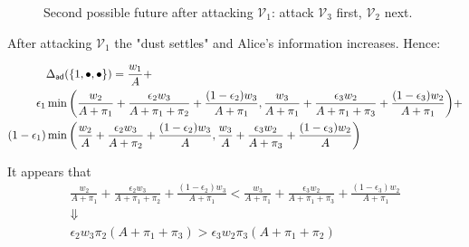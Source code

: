 \documentclass[11pt]{llncs}
\newcommand{\atk}{\begin{turn}{130}{\scriptsize \Lightning}\end{turn}}
\newcommand{\tk}{\raisebox{1ex}{\atk}}
\newcommand{\LL}[2]{\mbox{\tk $\mathcal{V}_{#1}$,~{\scriptsize \StopWatchEnd} #2}}
\begin{document}
\begin{figure}[!h]
\begin{center}
\end{center}
\caption{Second possible future after attacking $\mathcal{V}_1$: attack $\mathcal{V}_3$ first, $\mathcal{V}_2$ next.}
\label{fut2}
\end{figure}

After attacking $\mathcal{V}_1$ the "dust settles" and Alice's information increases. Hence:

\begin{alignat*}{10}
&\Delta_{\mbox{\scriptsize {\sf ad}}}(\{1,\bullet,\bullet\})=\frac{w_1}{A}+ \\
\epsilon_1     & \min\bigg(\frac{w_2}{A+\pi_1}+\frac{\epsilon_2 w_3}{A+\pi_1+\pi_2}+\frac{(1-\epsilon_2) w_3}{A+\pi_1},\frac{w_3}{A+\pi_1}+\frac{\epsilon_3 w_2}{A+\pi_1+\pi_3}+\frac{(1-\epsilon_3) w_2}{A+\pi_1}\bigg)+\\
(1-\epsilon_1) & \min\bigg(\frac{w_2}{A}+\frac{\epsilon_2 w_3}{A+\pi_2}+\frac{(1-\epsilon_2) w_3}{A},\frac{w_3}{A}+\frac{\epsilon_3 w_2}{A+\pi_3}+\frac{(1-\epsilon_3) w_2}{A}\bigg)\\
\end{alignat*}

It appears that
\begin{gather*}
\frac{w_2}{A+\pi_1}+\frac{\epsilon_2 w_3}{A+\pi_1+\pi_2}+\frac{(1-\epsilon_2) w_3}{A+\pi_1}<\frac{w_3}{A+\pi_1}+\frac{\epsilon_3 w_2}{A+\pi_1+\pi_3}+\frac{(1-\epsilon_3) w_2}{A+\pi_1}\\
\Downarrow\\
\epsilon_2 w_3 \pi_2(A+\pi_1+\pi_3)>\epsilon_3 w_2 \pi_3(A+\pi_1+\pi_2)
\end{gather*}
\end{document}
